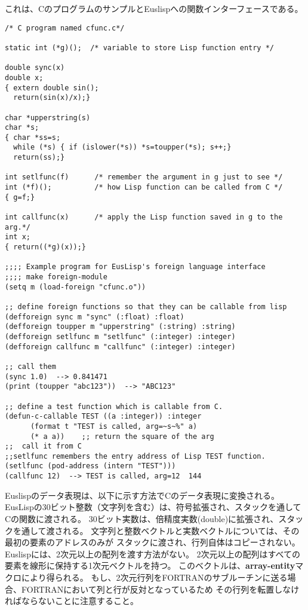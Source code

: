 これは、CのプログラムのサンプルとEuslispへの関数インターフェースである。
\begin{verbatim}
/* C program named cfunc.c*/

static int (*g)();	/* variable to store Lisp function entry */

double sync(x)
double x;
{ extern double sin();
  return(sin(x)/x);}

char *upperstring(s)
char *s;
{ char *ss=s;
  while (*s) { if (islower(*s)) *s=toupper(*s); s++;}
  return(ss);}

int setlfunc(f)      /* remember the argument in g just to see */
int (*f)();          /* how Lisp function can be called from C */
{ g=f;}

int callfunc(x)      /* apply the Lisp function saved in g to the arg.*/
int x;
{ return((*g)(x));}

;;;; Example program for EusLisp's foreign language interface
;;;; make foreign-module
(setq m (load-foreign "cfunc.o"))

;; define foreign functions so that they can be callable from lisp
(defforeign sync m "sync" (:float) :float)
(defforeign toupper m "upperstring" (:string) :string)
(defforeign setlfunc m "setlfunc" (:integer) :integer)
(defforeign callfunc m "callfunc" (:integer) :integer)

;; call them
(sync 1.0)	--> 0.841471
(print (toupper "abc123"))  --> "ABC123"

;; define a test function which is callable from C.
(defun-c-callable TEST ((a :integer)) :integer
      (format t "TEST is called, arg=~s~%" a)
      (* a a))    ;; return the square of the arg
;;  call it from C
;;setlfunc remembers the entry address of Lisp TEST function.
(setlfunc (pod-address (intern "TEST")))
(callfunc 12)  --> TEST is called, arg=12  144
\end{verbatim}
  
Euslispのデータ表現は、以下に示す方法でCのデータ表現に変換される。
EusLispの30ビット整数（文字列を含む）は、符号拡張され、スタックを通してCの関数に渡される。
30ビット実数は、倍精度実数(double)に拡張され、スタックを通して渡される。
文字列と整数ベクトルと実数ベクトルについては、その最初の要素のアドレスのみが
スタックに渡され、行列自体はコピーされない。
Euslispには、2次元以上の配列を渡す方法がない。
2次元以上の配列はすべての要素を線形に保持する1次元ベクトルを持つ。
このベクトルは、{\bf array-entity}マクロにより得られる。
もし、2次元行列をFORTRANのサブルーチンに送る場合、FORTRANにおいて列と行が反対となっているため
その行列を転置しなければならないことに注意すること。

